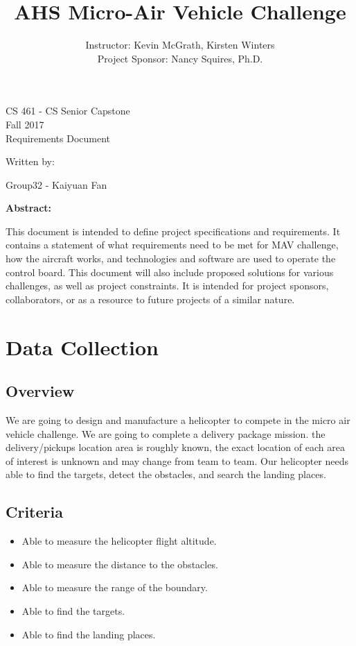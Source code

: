\documentclass[letterpaper, 10, draftclsnofoot, onecolumn]{IEEEtran}
\date{}
\title{AHS Micro-Air Vehicle Challenge}
\author{ Instructor: Kevin McGrath, Kirsten Winters \\
    Project Sponsor: Nancy Squires, Ph.D.
}
\def\class{CS 461 - CS Senior Capstone}
\def\term{Fall 2017}
\begin{document}
\null  %
\nointerlineskip  %
\vfill
\let\snewpage \newpage
\let\newpage \relax
\maketitle
\begin{center}
\class\\
\term\\
\huge{Requirements Document}\par
\vspace{2mm}
\large{Written by:}\par
\normalsize{Group32 - Kaiyuan Fan}\par
\vspace{8mm}
\large{\textbf{Abstract:}}\par 
\end{center}
\vspace{2mm}
\normalsize{
This document is intended to define project specifications and requirements. It contains a statement of what requirements need to be met for MAV challenge, how the aircraft works, and technologies and software are used to operate the control board. This document will also include proposed solutions for various challenges, as well as project constraints. It is intended for project sponsors, collaborators, or as a resource to future projects of a similar nature.

}

\let \newpage \snewpage
\vfill 
\break %

\tableofcontents

\section{Data Collection}
\subsection{Overview}
We are going to design and manufacture a helicopter to compete in the micro air vehicle challenge. We are going to complete a delivery package mission. the delivery/pickups location area is roughly known, the exact location of each area of interest is unknown and may change from team to team. Our helicopter needs able to find the targets, detect the obstacles, and search the landing places.


\subsection{Criteria}
\begin{itemize} 
\item Able to measure the helicopter flight altitude.
\item Able to measure the distance to the obstacles.
\item Able to measure the range of the boundary.
\item Able to find the targets.
\item 	Able to find the landing places.

\end{itemize}
\end{document}
